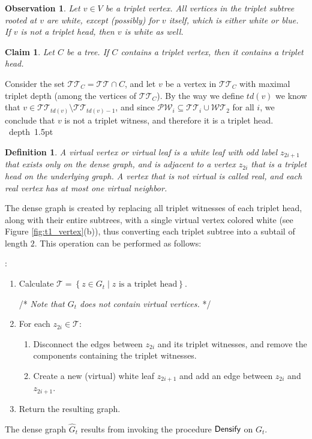 \documentclass[11pt]{article}
\def\Proof{\par\noindent{\bf Proof:~}}
\def\blackslug{\hbox{\hskip 1pt \vrule width 4pt height 8pt
    depth 1.5pt \hskip 1pt}}
\def\QED{\quad\blackslug\lower 8.5pt\null\par}
\def\dnsitem{\vspace{-7pt}\item}
\def\dnssubitem{\vspace{-5pt}\item}
\newtheorem{definition}[theorem]{Definition}
\newtheorem{claim}[theorem]{Claim}
\newtheorem{observation}[theorem]{Observation}
\theoremstyle{definition}
\def\densify{\mbox{\sf Densify}}
\begin{document}
\begin{observation}
\label{obs:triplet_subtrees_white}
Let $v \in V$ be a triplet vertex. 
All vertices in the triplet subtree rooted at $v$ are white, except (possibly) for $v$ itself, which is either white or blue.
If $v$ is not a triplet head, then $v$ is white as well.
\end{observation}



\begin{claim}
\label{claim:triplet_vertex_implies_head}
Let $C$ be a tree. If $C$ contains a triplet vertex, then it contains a triplet head.
\end{claim}
\Proof
Consider the set $\mathcal{TT}_C = \mathcal{TT} \cap C$, and let $v$ be a vertex in $\mathcal{TT}_C$ with maximal triplet depth (among the vertices of $\mathcal{TT}_C$).
By the way we define $td(v)$ we know that $v \in \mathcal{TT}_{td(v)} \setminus \mathcal{TT}_{td(v) - 1}$, 
and since $\mathcal{PW}_i \subseteq \mathcal{TT}_i \cup \mathcal{WT}_2$ for all $i$, we conclude that $v$ is not a triplet witness, and therefore it is a triplet head.
\QED

\begin{definition}
A \emph{virtual vertex} or \emph{virtual leaf} is a white leaf with odd label $z_{2i+1}$ that exists only on the dense graph, and is adjacent to a vertex $z_{2i}$ that is a triplet head on the underlying graph.
A vertex that is not virtual is called \emph{real}, and each real vertex has at most one virtual neighbor.
\end{definition}

The dense graph is created by replacing all triplet witnesses of each triplet head, along with their entire subtrees, 
with a single virtual vertex colored white (see Figure \ref{fig:t1_vertex}(b)), thus converting each triplet subtree into a subtail of length $2$.
This operation can be performed as follows:
\smallskip
\par\noindent{\bf Procedure \densify}:
\begin{enumerate}
	\dnsitem
	Calculate $\mathcal{T} = \left\{z \in G_t \mid z \textrm{ is a triplet head}\right\}$.
	
	/* \textit{Note that $G_t$ does not contain virtual vertices.} */ 
	\dnsitem For each $z_{2i} \in \mathcal{T}$:
	\begin{enumerate}
		\dnsitem Disconnect the edges between $z_{2i}$ and its triplet witnesses, and remove the components containing the triplet witnesses.
		\dnssubitem Create a new (virtual) white leaf $z_{2i+1}$ and add an edge between $z_{2i}$ and $z_{2i+1}$.
	\end{enumerate}
	\dnsitem Return the resulting graph.
\end{enumerate}
The dense graph $\hat{G}_t$ results from invoking the procedure $\densify$ on $G_t$.
\end{document}
